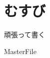 \documentclass[a4j,twoside,12pt]{thesis} %
\begin{document}
\addtocounter{chapter}{+5}

\setlength{\baselineskip}{1.95zw}
\setlength{\textheight}{30\baselineskip}

\fi


\chapter{むすび}\label{conc}
頑張って書く

\expandafter\ifx\csname MasterFile\endcsname\relax
\def\MasterFile{本原稿です}

% 



\end{document}
